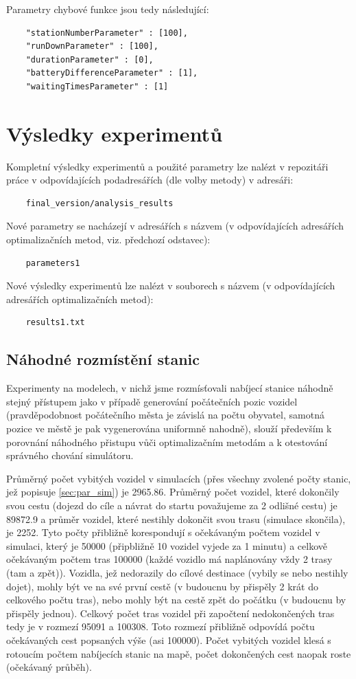 Parametry chybové funkce jsou tedy následující:

\begin{verbatim}
    "stationNumberParameter" : [100],
    "runDownParameter" : [100],
    "durationParameter" : [0],
    "batteryDifferenceParameter" : [1],
    "waitingTimesParameter" : [1]
\end{verbatim}

\section{Výsledky experimentů}
Kompletní výsledky experimentů a použité parametry lze nalézt v repozitáři práce v 
odpovídajících podadresářích (dle volby metody) v adresáři:

\begin{verbatim}
    final_version/analysis_results
\end{verbatim}

Nové parametry se nacházejí v adresářích s názvem (v odpovídajících adresářích 
optimalizačních metod, viz. předchozí odstavec):
\begin{verbatim}
    parameters1
\end{verbatim}

Nové výsledky experimentů lze nalézt v souborech s názvem (v odpovídajících adresářích 
optimalizačních metod):
\begin{verbatim}
    results1.txt
\end{verbatim}

\subsection{Náhodné rozmístění stanic}
Experimenty na modelech, v nichž jsme rozmísťovali nabíjecí stanice náhodně
stejný přístupem jako v případě generování počátečních pozic vozidel 
(pravděpodobnost počátečního města je závislá na počtu obyvatel, samotná pozice ve
městě je pak vygenerována uniformně nahodně), slouží především k porovnání náhodného 
přistupu vůči optimalizačním metodám a k otestování správného chování simulátoru.

Průměrný počet vybitých vozidel v simulacích (přes všechny zvolené počty stanic, jež
popisuje \cref{sec:par_sim}) je 2965.86. Průměrný počet vozidel, které dokončily 
svou cestu (dojezd do cíle a návrat do startu považujeme za 2 odlišné cestu) 
je 89872.9 a průměr vozidel, které nestihly dokončit svou trasu (simulace skončila), je
2252. Tyto počty přibližně korespondují s očekávaným počtem vozidel v simulaci, který je
50000 (připbližně 10 vozidel vyjede za 1 minutu) a celkově očekávaným počtem tras 100000
(každé vozidlo má naplánovány vždy 2 trasy (tam a zpět)). Vozidla, jež nedorazily
do cílové destinace (vybily se nebo nestihly dojet), mohly být ve na své první cestě (v budoucnu by
přispěly 2 krát do celkového počtu tras), nebo mohly být na cestě zpět do počátku 
(v budoucnu by přispěly jednou). Celkový počet tras vozidel při započtení nedokončených tras tedy
je v rozmezí 95091 a 100308. Toto rozmezí přibližně odpovídá
počtu očekávaných cest popsaných výše (asi 100000). Počet vybitých vozidel klesá s rotoucím počtem nabíjecích stanic
na mapě, počet dokončených cest naopak roste (očekávaný průběh).

